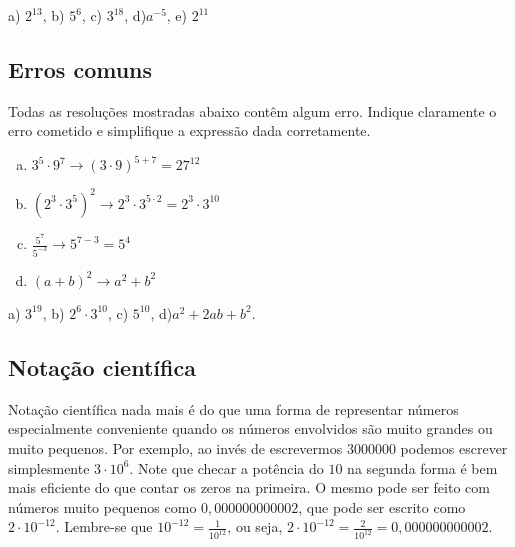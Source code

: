 \documentclass[main_estudante.tex]{subfiles}
\begin{document}
\begin{gabarito}
	\begin{gabaritoQuestao}
		a) $2^{13}$, b) $5^6$, c) $3^{18}$, d)$a^{-5}$, e) $2^{11}$
	\end{gabaritoQuestao}
\end{gabarito}

\subsection*{Erros comuns}

\begin{questao}
Todas as resoluções mostradas abaixo contêm algum erro. Indique claramente o erro cometido e simplifique a expressão dada corretamente.
\begin{enumerate}[a)]
\item $3^5 \cdot 9^7  \longrightarrow (3 \cdot 9)^{5+7} = 27^{12}$
\item $(2^3 \cdot 3^5)^2  \longrightarrow 2^3 \cdot 3^{5 \cdot 2} = 2^3 \cdot 3^{10}$
\item $\frac{5^7}{5^{-3}}  \longrightarrow 5^{7-3}=5^4$
\item $(a+b)^2 \longrightarrow a^2+b^2$
\end{enumerate}
\end{questao}

\begin{gabarito}
	\begin{gabaritoQuestao}
		a) $3^{19}$, b) $2^6 \cdot 3^{10}$, c) $5^{10}$, d)$a^2+2ab+b^2$.
	\end{gabaritoQuestao}
\end{gabarito}

\subsection*{Notação científica}

Notação científica nada mais é do que uma forma de representar números especialmente conveniente quando os números envolvidos são muito grandes ou muito pequenos. Por exemplo, ao invés de escrevermos $3000000$ podemos escrever simplesmente $3 \cdot 10^6$. Note que checar a potência do $10$ na segunda forma é bem mais eficiente do que contar os zeros na primeira. O mesmo pode ser feito com números muito pequenos como $0,000000000002$, que pode ser escrito como $2 \cdot 10^{-12}$. Lembre-se que $10^{-12} = \frac{1}{10^12}$, ou seja, $2 \cdot 10^{-12} = \frac{2}{10^12} = 0,000000000002$.
\end{document}
